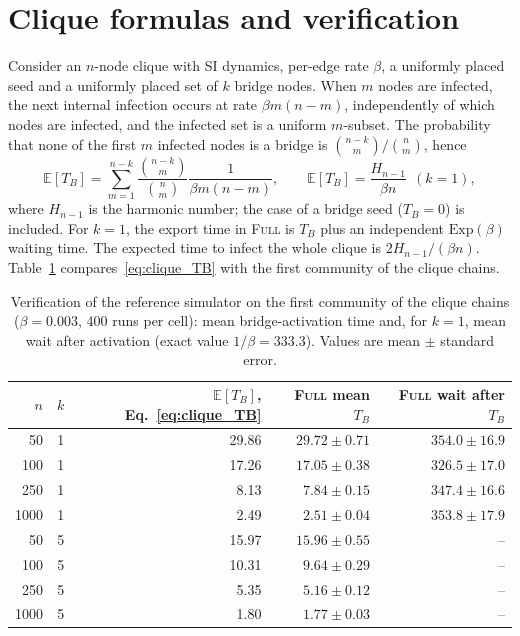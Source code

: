 \documentclass[a4paper,fleqn]{cas-sc}
\newcommand{\Exp}{\mathrm{Exp}}
\newcommand{\Full}{\textup{\textsc{Full}}}
\begin{document}
\appendix

\clearpage
\section{Clique formulas and verification}
\label{app:clique}

Consider an $n$-node clique with SI dynamics, per-edge rate $\beta$, a uniformly placed seed and a uniformly placed set of $k$ bridge nodes. When $m$ nodes are infected, the next internal infection occurs at rate $\beta m(n-m)$, independently of which nodes are infected, and the infected set is a uniform $m$-subset. The probability that none of the first $m$ infected nodes is a bridge is $\binom{n-k}{m}/\binom{n}{m}$, hence
\begin{equation}
\label{eq:clique_TB}
\mathbb{E}[T_B]=\sum_{m=1}^{n-k}\frac{\binom{n-k}{m}}{\binom{n}{m}}\frac{1}{\beta m(n-m)},
\qquad
\mathbb{E}[T_B]=\frac{H_{n-1}}{\beta n}\ \ (k=1),
\end{equation}
where $H_{n-1}$ is the harmonic number; the case of a bridge seed ($T_B=0$) is included. For $k=1$, the export time in \Full{} is $T_B$ plus an independent $\Exp(\beta)$ waiting time. The expected time to infect the whole clique is $2H_{n-1}/(\beta n)$. Table~\ref{tab:verification} compares~\eqref{eq:clique_TB} with the first community of the clique chains.

\clearpage
\begin{table}[H]
\centering
\caption{Verification of the reference simulator on the first community of the clique chains ($\beta=0.003$, 400 runs per cell): mean bridge-activation time and, for $k=1$, mean wait after activation (exact value $1/\beta=333.3$). Values are mean $\pm$ standard error.}
\label{tab:verification}
\small
\begin{tabular}{rrrrr}
\toprule
$n$ & $k$ & $\mathbb{E}[T_B]$, Eq.~\eqref{eq:clique_TB} & \Full{} mean $T_B$ & \Full{} wait after $T_B$\\
\midrule
50 & 1 & 29.86 & $29.72\pm0.71$ & $354.0\pm16.9$\\
100 & 1 & 17.26 & $17.05\pm0.38$ & $326.5\pm17.0$\\
250 & 1 & 8.13 & $7.84\pm0.15$ & $347.4\pm16.6$\\
1000 & 1 & 2.49 & $2.51\pm0.04$ & $353.8\pm17.9$\\
50 & 5 & 15.97 & $15.96\pm0.55$ & --\\
100 & 5 & 10.31 & $9.64\pm0.29$ & --\\
250 & 5 & 5.35 & $5.16\pm0.12$ & --\\
1000 & 5 & 1.80 & $1.77\pm0.03$ & --\\
\bottomrule
\end{tabular}
\end{table}
\end{document}

